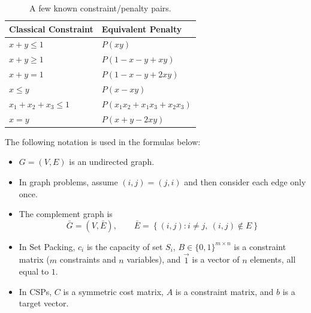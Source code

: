\begin{table}[!htp]
    \centering
    \begin{tabular}{@{} l l @{}}
        \toprule
        \textbf{Classical Constraint} & \textbf{Equivalent Penalty} \\
        \midrule
        $x+y\leq 1$
        & $P(xy)$ \\[.3em]

        $x+y\geq 1$
        & $P(1-x-y+xy)$ \\[.3em]

        $x+y=1$
        & $P(1-x-y+2xy)$ \\[.3em]

        $x\leq y$
        & $P(x-xy)$ \\[.3em]

        $x_1+x_2+x_3\leq 1$
        & $P(x_1x_2+x_1x_3+x_2x_3)$ \\[.3em]

        $x=y$
        & $P(x+y-2xy)$ \\
        \bottomrule
    \end{tabular}
    \caption{A few known constraint/penalty pairs.}
    \label{tab:qubo-penalty-conversion}
\end{table}

\noindent
The following notation is used in the formulas below:
\begin{itemize}
    \item $G=(V,E)$ is an undirected graph.

    \item In graph problems, assume $(i,j)=(j,i)$ and then consider each edge only once.

    \item The complement graph is
        \begin{equation*}
            \bar{G}=(V,\bar{E}),
            \qquad
            \bar{E}
            =
            \left\{
                (i,j) : i\neq j,\ (i,j)\notin E
            \right\}
        \end{equation*}

    \item In Set Packing, $c_i$ is the capacity of set $S_i$,
        $B\in\{0,1\}^{m\times n}$ is a constraint matrix
        ($m$ constraints and $n$ variables), and
        $\vec{1}$ is a vector of $n$ elements, all equal to $1$.

    \item In CSPs, $C$ is a symmetric cost matrix, $A$ is a constraint
        matrix, and $b$ is a target vector.
\end{itemize}

